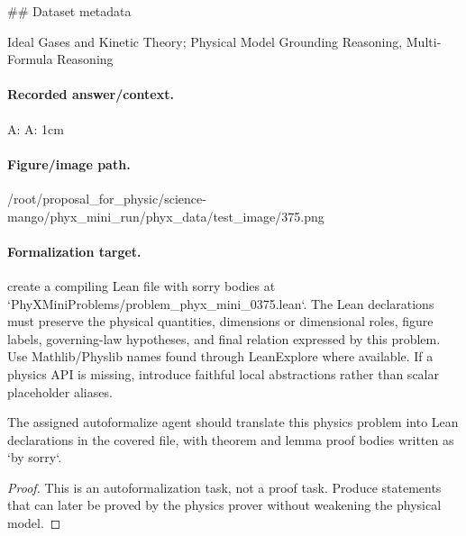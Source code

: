 \#\# Dataset metadata

Ideal Gases and Kinetic Theory; Physical Model Grounding Reasoning, Multi-Formula Reasoning

\paragraph{Recorded answer/context.}
A: A: 1cm

\paragraph{Figure/image path.}
/root/proposal\_for\_physic/science-mango/phyx\_mini\_run/phyx\_data/test\_image/375.png

\paragraph{Formalization target.}
create a compiling Lean file with sorry bodies at `PhyXMiniProblems/problem\_phyx\_mini\_0375.lean`. The Lean declarations must preserve the physical quantities, dimensions or dimensional roles, figure labels, governing-law hypotheses, and final relation expressed by this problem.
Use Mathlib/Physlib names found through LeanExplore where available. If a physics API is missing, introduce faithful local abstractions rather than scalar placeholder aliases.

\begin{theorem}
\label{thm:physics:phyx_mini_0375:target}
The assigned autoformalize agent should translate this physics problem into Lean declarations in the covered file, with theorem and lemma proof bodies written as `by sorry`.
\end{theorem}
\begin{proof}
This is an autoformalization task, not a proof task. Produce statements that can later be proved by the physics prover without weakening the physical model.
\end{proof}

